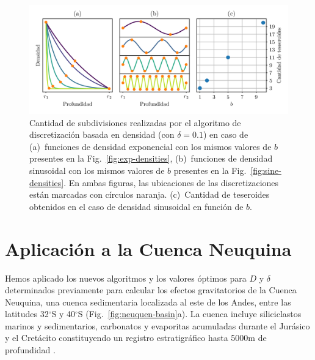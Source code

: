 \begin{figure}
\centering
\includegraphics[width=\linewidth]{figs/tesseroids-variable-density/number-of-tesseroids.png}
\caption{
    Cantidad de subdivisiones realizadas por el algoritmo de discretización
    basada en densidad (con $\delta = 0.1$) en caso de
    (a)~funciones de densidad exponencial con los mismos valores de $b$
    presentes en la Fig.~\ref{fig:exp-densities},
    (b)~funciones de densidad sinusoidal con los mismos valores de $b$
    presentes en la Fig.~\ref{fig:sine-densities}.
    En ambas figuras, las ubicaciones de las discretizaciones están marcadas
    con círculos naranja.
    (c)~Cantidad de teseroides obtenidos en el caso de densidad sinusoidal en
    función de $b$.
}
\label{fig:number-of-tesseroids}
\end{figure}



\section{Aplicación a la Cuenca Neuquina}

Hemos aplicado los nuevos algoritmos y los valores óptimos para $D$
y $\delta$ determinados previamente para calcular los efectos gravitatorios de
la Cuenca Neuquina, una cuenca sedimentaria localizada al este de los Andes,
entre las latitudes 32$^\circ$S y 40$^\circ$S (Fig.~\ref{fig:neuquen-basin}a).
La cuenca incluye siliciclastos marinos y sedimentarios, carbonatos
y evaporitas acumuladas durante el Jurásico y el Cretácito constituyendo un
registro estratigráfico hasta 5000m de profundidad \citep{howell2005}.

